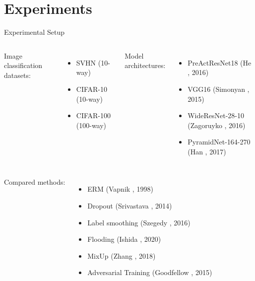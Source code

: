 \section{Experiments}


\begin{frame}{Experimental Setup}

\begin{columns}
Image classification datasets:
\begin{itemize}
    \item SVHN (10-way)
    \item CIFAR-10 (10-way)
    \item CIFAR-100 (100-way)
\end{itemize}


Model architectures:
\begin{itemize}
    \item PreActResNet18 (He \etal, 2016)
    \item VGG16 (Simonyan \etal, 2015)
    \item WideResNet-28-10 (Zagoruyko \etal, 2016)
    \item PyramidNet-164-270 (Han \etal, 2017)
\end{itemize}
\end{columns}

\begin{columns}
Compared methods:
\begin{itemize}
    \item ERM (Vapnik \etal, 1998)
    \item Dropout (Srivastava \etal, 2014)
    \item Label smoothing (Szegedy \etal, 2016)
    \item Flooding (Ishida \etal, 2020)
    \item MixUp (Zhang \etal, 2018)
    \item Adversarial Training (Goodfellow \etal, 2015)
\end{itemize}
\end{columns}

\vspace{1.5em}

\end{frame}


